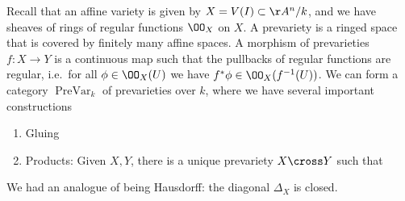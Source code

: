 Recall that an affine variety is given by \(X = V(I) \subset \AA^n/k\),
and we have sheaves of rings of regular functions \(\OO_X\) on \(X\). A
prevariety is a ringed space that is covered by finitely many affine
spaces. A morphism of prevarieties \(f:X\to Y\) is a continuous map such
that the pullbacks of regular functions are regular, i.e.~for all
\(\phi \in \OO_X(U)\) we have \(f^* \phi \in \OO_X(f^{-1} (U) )\). We
can form a category \(\operatorname{PreVar}_k\) of prevarieties over
\(k\), where we have several important constructions

\begin{enumerate}
\def\labelenumi{\arabic{enumi}.}
\item
  Gluing
\item
  Products: Given \(X, Y\), there is a unique prevariety \(X\cross Y\)
  such that

  \begin{center}\end{center}
\end{enumerate}

We had an analogue of being Hausdorff: the diagonal \(\Delta_X\) is
closed.


